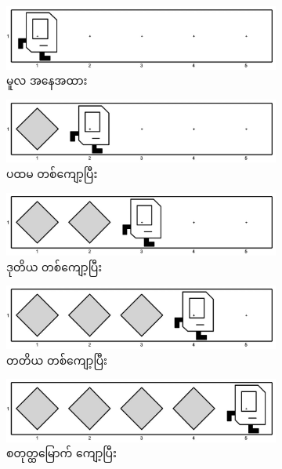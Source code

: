 \begin{figure}[tbh!]
    \newcommand{\figpctw}{0.455}
    \newcommand{\figscale}{0.16}
    \begin{subfigure}[t]{{\figpctw}\textwidth}
        \includegraphics[scale=\figscale]{images/ch02/mbr/init.jpg}
        \caption{မူလ အနေအထား}    
    \end{subfigure}
    \begin{subfigure}[t]{{\figpctw}\textwidth}
        \includegraphics[scale=\figscale]{images/ch02/mbr/1st_iter.jpg}
        \caption{ပထမ တစ်ကျော့ပြီး}    
    \end{subfigure}
    \begin{subfigure}[t]{{\figpctw}\textwidth}
        \includegraphics[scale=\figscale]{images/ch02/mbr/2nd_iter.jpg}
        \caption{ဒုတိယ တစ်ကျော့ပြီး}    
    \end{subfigure}
    \begin{subfigure}[t]{{\figpctw}\textwidth}
        \includegraphics[scale=\figscale]{images/ch02/mbr/3rd_iter.jpg}
        \caption{တတိယ တစ်ကျော့ပြီး}    
    \end{subfigure}
    \begin{subfigure}[t]{{\figpctw}\textwidth}
        \includegraphics[scale=\figscale]{images/ch02/mbr/4th_iter.jpg}
        \caption{စတုတ္ထမြောက် ကျော့ပြီး}    
    \end{subfigure}   
    \caption{}
    \label{fig:mbr_iters}
\end{figure}

